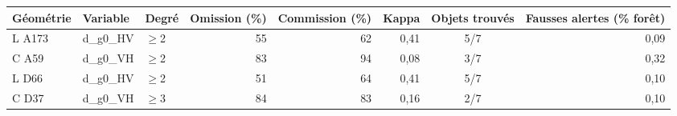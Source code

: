 \begin{tabular}{lllrrrcr}
\toprule
Géométrie & Variable & Degré & Omission (\%) & Commission (\%) & Kappa & Objets trouvés & Fausses alertes (\% forêt) \\
\midrule
L A173 & d\_g0\_HV & $\geq$2 & 55 & 62 & 0{,}41 & 5/7 & 0{,}09 \\
C A59 & d\_g0\_VH & $\geq$2 & 83 & 94 & 0{,}08 & 3/7 & 0{,}32 \\
L D66 & d\_g0\_HV & $\geq$2 & 51 & 64 & 0{,}41 & 5/7 & 0{,}10 \\
C D37 & d\_g0\_VH & $\geq$3 & 84 & 83 & 0{,}16 & 2/7 & 0{,}10 \\
\bottomrule
\end{tabular}
